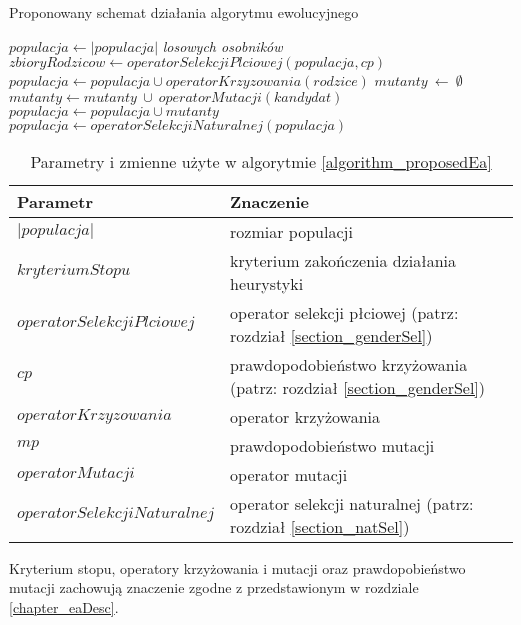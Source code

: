 \documentclass[twoside]{iisthesis}
\begin{document}
\begin{algorithm}
	\caption{Proponowany schemat działania algorytmu ewolucyjnego}
	\label{algorithm_proposedEa}
	\begin{algorithmic}[1]
		\Var $populacja \gets |populacja|$ \textit{losowych osobników}
		\Var $zbioryRodzicow \gets operatorSelekcjiPlciowej(populacja, cp)$
		\State $populacja \gets populacja \cup operatorKrzyzowania(rodzice)$
		\EndFor
		\Var $mutanty\ \gets\ \emptyset$
		\State $mutanty \gets mutanty\ \cup\ operatorMutacji(kandydat)$
		\EndIf
		\EndFor
		\State $populacja \gets populacja \cup mutanty$    
		\State $populacja \gets operatorSelekcjiNaturalnej(populacja)$
		\EndWhile  
		\EndProcedure
	\end{algorithmic}
\end{algorithm}

\begin{table}
	\caption{Parametry i zmienne użyte w algorytmie \ref{algorithm_proposedEa}}
	\label{table_proposedEa}
	\begin{tabularx}{\linewidth}{lX}
		\hline
		\textbf{Parametr} & \textbf{Znaczenie} \\
		\hline
		\hline
		$|populacja|$ & rozmiar populacji \\
		\hline
		$kryteriumStopu$ & kryterium zakończenia działania heurystyki \\
		\hline
		$operatorSelekcjiPlciowej$ & operator selekcji płciowej (patrz: rozdział \ref{section_genderSel}) \\
		\hline
		$cp$ & prawdopodobieństwo krzyżowania (patrz: rozdział \ref{section_genderSel}) \\
		\hline
		$operatorKrzyzowania$ & operator krzyżowania \\
		\hline
		$mp$ & prawdopodobieństwo mutacji \\
		\hline
		$operatorMutacji$ & operator mutacji \\
		\hline
		$operatorSelekcjiNaturalnej$ & operator selekcji naturalnej (patrz: rozdział \ref{section_natSel}) \\
		\hline
	\end{tabularx}
\end{table}

Kryterium stopu, operatory krzyżowania i mutacji oraz prawdopobieństwo mutacji zachowują znaczenie zgodne z przedstawionym w rozdziale \ref{chapter_eaDesc}.
\end{document}
